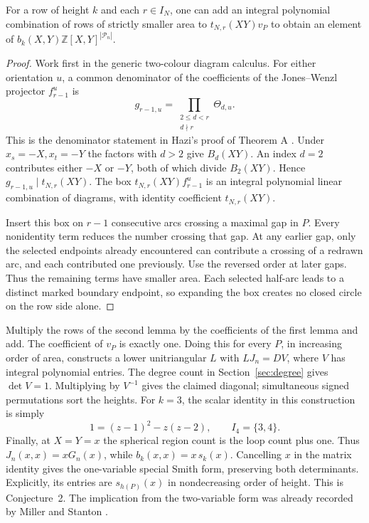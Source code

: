 \begin{lemma}
For a row of height \(k\) and each \(r\in I_N\), one can add an
integral polynomial combination of rows of strictly smaller area
to \(t_{N,r}(XY)v_P\) to obtain an element of
\(b_k(X,Y)\mathbb Z[X,Y]^{|\mathcal P_n|}\).
\end{lemma}
\begin{proof}
Work first in the generic two-colour diagram calculus. For either
orientation \(u\), a common denominator of the coefficients of
the Jones--Wenzl projector \(f^u_{r-1}\) is
\[
 g_{r-1,u}=\prod_{\substack{2\le d<r\\d\nmid r}}\Theta_{d,u}.
\]
This is the denominator statement in Hazi's proof of Theorem A
\cite[\S4, Lemma 4.2 and the proof of Theorem A]{hazi}.
Under \(x_s=-X, x_t=-Y\) the factors with \(d>2\) give
\(B_d(XY)\). An index \(d=2\) contributes either \(-X\) or \(-Y\),
both of which divide \(B_2(XY)\). Hence \(g_{r-1,u}\mid t_{N,r}(XY)\).
The box \(t_{N,r}(XY)f^u_{r-1}\) is an integral polynomial
linear combination of diagrams, with identity coefficient \(t_{N,r}(XY)\).

Insert this box on \(r-1\) consecutive arcs crossing a maximal gap in
\(P\). Every nonidentity term reduces the number crossing that gap.
At any earlier gap, only the selected endpoints already encountered
can contribute a crossing of a redrawn arc, and each contributed one
previously. Use the reversed order at later gaps. Thus the remaining
terms have smaller area. Each selected half-arc leads to a distinct
marked boundary endpoint, so expanding the box creates no closed
circle on the row side alone.


\end{proof}

Multiply the rows of the second lemma by the coefficients of the
first lemma and add. The coefficient of \(v_P\) is exactly one.
Doing this for every \(P\), in increasing order of area, constructs
a lower unitriangular \(L\) with \(LJ_n=DV\), where \(V\) has
integral polynomial entries. The degree count in Section~\ref{sec:degree}
gives \(\det V=1\). Multiplying by \(V^{-1}\) gives the claimed
diagonal; simultaneous signed permutations sort the heights.
For \(k=3\), the scalar identity in this construction is simply
\[
             1=(z-1)^2-z(z-2),\qquad I_4=\{3,4\}.
\]
Finally, at \(X=Y=x\) the spherical region count is the loop count
plus one. Thus \(J_n(x,x)=xG_n(x)\), while
\(b_k(x,x)=x\,s_k(x)\). Cancelling \(x\) in the matrix identity
gives the one-variable special Smith form, preserving both
determinants. Explicitly, its entries are \(s_{h(P)}(x)\) in
nondecreasing order of height. This is Conjecture~2. The implication
from the two-variable form was already recorded by Miller and
Stanton \cite[arXiv version, equation (64)]{ms}.


